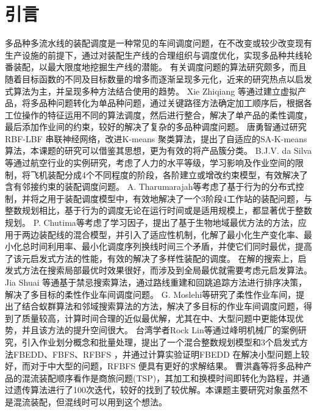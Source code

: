 \chapter{引言}
多品种多流水线的装配调度是一种常见的车间调度问题，在不改变或较少改变现有生产设施的前提下，通过对装配生产线的合理组织与调度优化，实现多品种共线轮番装配，以最大限度地挖掘生产线的潜能。
有关调度问题的算法研究颇多，而且随着目标函数的不同及目标数量的增多而逐渐呈现多元化，近来的研究热点以启发式算法为主，并呈现多种方法结合使用的趋势。
Xie Zhiqiang\cite{xie2010study} 等通过建立虚拟产品，将多品种问题转化为单品种问题，通过关键路径方法确定加工顺序后，根据各工位操作的特征运用不同的算法调度，然后进行整合，解决了单产品的柔性调度，最后添加作业间的约束，较好的解决了复杂的多品种调度问题。
唐勇智\cite{唐勇智2009基于聚类的}通过研究RBF-LBF 串联神经网络，改进K-means 聚类算法，提出了自适应的SA-K-means 算法，本课题的研究可以借鉴其思想，更为有效的将产品簇分类。
B.J.V. da Silva\cite{da2014production} 等通过航空行业的实例研究，考虑了人力的水平等级，学习影响及作业空间的限制，将飞机装配分成4个不同程度的阶段，各阶建立或增改约束模型，有效解决了含有邻接约束的装配调度问题。
A. Tharumarajah\cite{1998distributed}等考虑了基于行为的分布式控制，并将之用于装配调度模型中，有效地解决了一个3阶段4工作站的装配问题，与整数规划相比，基于行为的调度无论在运行时间或是适用规模上，都显著优于整数规划。
P. Chutima\cite{chutima2014pareto}等考虑了学习因子，提出了基于生物地域最优方法的方法，应用于两边装配线的混合模型，并引入了适应性机制，化解了最小化生产变化率、最小化总时间利用率、最小化调度序列换线时间三个矛盾，并使它们同时最优，提高了该元启发式方法的性能，有效的解决了多样性装配的调度。
在解的搜索上，启发式方法在搜索局部最优时效果很好，而涉及到全局最优就需要考虑元启发算法。
Jia Shuai\cite{jia2014path} 等通基于禁忌搜索算法，通过路线重建和回跳追踪方法进行排序决策，解决了多目标的柔性作业车间调度问题。
G. Moslehi\cite{moslehi2011pareto}等研究了柔性作业车间，提出了结合蚁群算法和邻域搜索算法的方法，解决了多目标的作业车间调度问题，得到了质量较高，计算时间合理的近似最优解，尤其在中、大型问题中更能体现优势，并且该方法的提升空间很大。
台湾学者Rock Lin\cite{lin2012case}等通过峰明机械厂的案例研究，引入作业划分概念和批量处理，提出了一个混合整数规划模型和3个启发式方法FBEDD、FBFS、RFBFS ，并通过计算实验证明FBEDD 在解决小型问题上较好，而对于中大型的问题，RFBFS 便具有更好的求解结果。
曹洪鑫\cite{曾洪鑫2006}等将多品种产品的混流装配顺序看作是商旅问题(TSP)，其加工和换模时间即转化为路程，并通过遗传算法进行了100次迭代，较好的找到了较优解。本课题主要研究对象虽然不是混流装配，但混线时可以用到这个想法。

